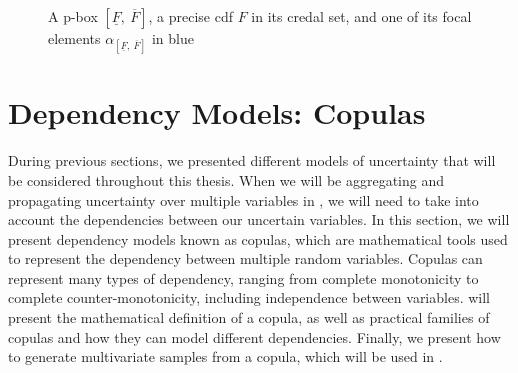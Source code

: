 \begin{figure}[!ht]
    \centering
    \caption{A p-box $[\underline{F}, ~\overline{F}]$, a precise \acrshort{cdf} $F$ in its credal set, and one of its focal elements $\alpha_{[\underline{F}, ~\overline{F}]}$ in blue}
    \label{fig:p-box}
\end{figure}


\section{Dependency Models: Copulas}\label{sec:copulas}
During previous sections, we presented different models of uncertainty that will be considered throughout this thesis. When we will be aggregating and propagating uncertainty over multiple variables in , we will need to take into account the dependencies between our uncertain variables. In this section, we will present dependency models known as copulas, which are mathematical tools used to represent the dependency between multiple random variables. Copulas can represent many types of dependency, ranging from complete monotonicity to complete counter-monotonicity, including independence between variables.  will present the mathematical definition of a copula, as well as practical families of copulas and how they can model different dependencies. Finally, we present how to generate multivariate samples from a copula, which will be used in .

